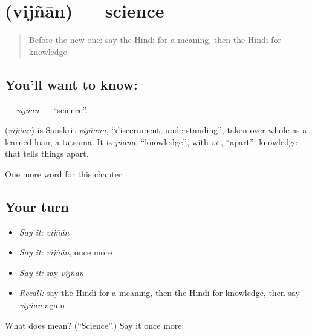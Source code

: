 \section[\texorpdfstring{\hi{विज्ञान} (vijñān)}{विज्ञान (vijñān)}]{ (vijñān) — science}

\label{lesson:HI-C198-vijnan}



\begin{quote}
Before the new one: say the Hindi for a meaning, then the Hindi for knowledge.
\end{quote}

\subsection*{You'll want to know: }
\textbf{} — \emph{vijñān} — \textquotedblleft{}science\textquotedblright{}.

\begin{cousinweb}
\textbf{} (\emph{vijñān}) is Sanskrit \emph{vijñāna}, \textquotedblleft{}discernment, understanding\textquotedblright{}, taken over whole as a learned loan, a tatsama. It is \emph{jñāna}, \textquotedblleft{}knowledge\textquotedblright{}, with \emph{vi-}, \textquotedblleft{}apart\textquotedblright{}: knowledge that tells things apart.
\end{cousinweb}

\begin{grammarlens}[title={What you've built}]
One more word for this chapter.
\end{grammarlens}

\subsection*{Your turn}
\begin{itemize}
\raggedright
  \item \emph{Say it:} \emph{vijñān}
  \item \emph{Say it:} \emph{vijñān}, once more
  \item \emph{Say it:} say \emph{vijñān}
  \item \emph{Recall:} say the Hindi for a meaning, then the Hindi for knowledge, then say \emph{vijñān} again
\end{itemize}

\begin{tcolorbox}[breakable,colback=teal!4,colframe=teal!35!black,title={Before you move on}]
What does  mean? (\textquotedblleft{}Science\textquotedblright{}.) Say it once more.
\end{tcolorbox}
